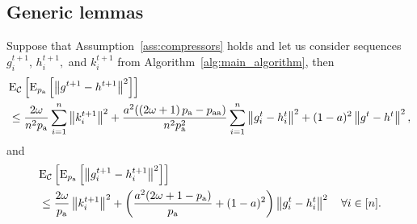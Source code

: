 \documentclass{article}
\newcommand*{\probavailable}{\ensuremath{p_{\textnormal{a}}}}
\newcommand*{\probpairaa}{\ensuremath{p_{\textnormal{aa}}}}
\begin{document}
\subsection{Generic lemmas}
\begin{lemma}
  Suppose that Assumption~\ref{ass:compressors} holds and let us consider sequences $g^{t+1}_i$, $h^{t+1}_i,$ and $k^{t+1}_i$ from Algorithm~\ref{alg:main_algorithm}, then
  \begin{align}
      \label{eq:compressor_global_error}
      &\ExpSub{\cC}{\ExpSub{\probavailable}{\norm{g^{t+1} - h^{t+1}}^2}} \nonumber \\
      &\leq \frac{2 \omega}{n^2 \probavailable}\sum_{i=1}^n\norm{k^{t+1}_i}^2 +\frac{a^2 (\left(2 \omega + 1\right)\probavailable - \probpairaa)}{n^2 \probavailable^2}\sum_{i=1}^n\norm{g^{t}_i - h^{t}_i}^2 + (1 - a)^2\norm{g^{t} - h^{t}}^2,
  \end{align}
  and
  \begin{align}
      \label{eq:compressor_local_error}
      &\ExpSub{\cC}{\ExpSub{\probavailable}{\norm{g^{t+1}_i - h^{t+1}_i}^2}} \nonumber \\
      &\leq \frac{2 \omega}{\probavailable}\norm{k^{t+1}_i}^2 + \left(\frac{a^2(2\omega + 1 - \probavailable)}{\probavailable} + (1 - a)^2\right)\norm{g^{t}_i - h^{t}_i}^2\quad \forall i \in [n].
  \end{align}
\end{lemma}
\end{document}
